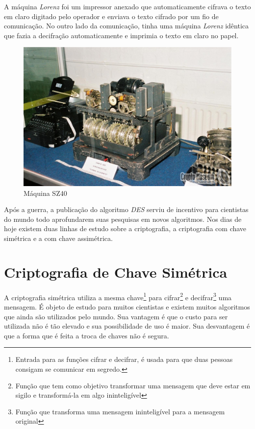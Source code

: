 A máquina \textit{Lorenz} foi um impressor anexado que automaticamente cifrava o texto em claro digitado pelo operador e enviava o texto cifrado por um fio de comunicação. No outro lado da comunicação, tinha uma máquina \textit{Lorenz} idêntica que fazia a decifração automaticamente e imprimia o texto em claro no papel. ~\cite{chris-collins}

\begin{figure}[h]
  \centering
  \includegraphics[keepaspectratio=true,scale=0.2]
  {figuras/sz40.eps}
  \caption[{Máquina SZ40}]{Máquina SZ40\protect\footnotemark}
    \label{sz40-machine}
\end{figure}

Após a guerra, a publicação do algoritmo \textit{DES} serviu de incentivo para cientistas do mundo todo aprofundarem suas pesquisas em novos algoritmos. Nos dias de hoje existem duas linhas de estudo sobre a criptografia, a criptografia com chave simétrica e a com chave assimétrica. 


\section{Criptografia de Chave Simétrica}
\label{symmetric-cryptography}

A criptografia simétrica utiliza a mesma chave\footnote{Entrada para as funções cifrar e decifrar, é usada para que duas pessoas consigam se comunicar em segredo.} para cifrar\footnote{Função que tem como objetivo transformar uma mensagem que deve estar em sigilo e transformá-la em algo ininteligível} e decifrar\footnote{Função que transforma uma mensagem ininteligível para a mensagem original} uma mensagem. É objeto de estudo para muitos cientistas e existem muitos algoritmos que ainda são utilizados pelo mundo. Sua vantagem é que o custo para ser utilizada não é tão elevado e sua possibilidade de uso é maior. Sua desvantagem é que a forma que é feita a troca de chaves não é segura.

